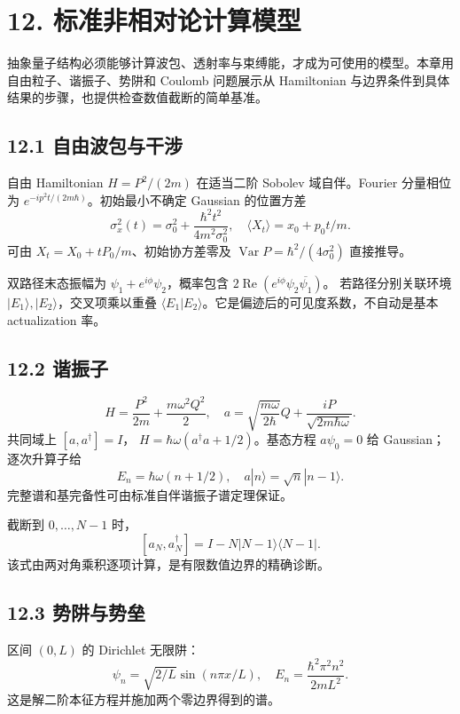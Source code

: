 \documentclass[
  11pt,
  oneside]{book}
\begin{document}
\chapter{12. 标准非相对论计算模型}\label{ch-12}\hypertarget{ch-12}{}

抽象量子结构必须能够计算波包、透射率与束缚能，才成为可使用的模型。本章用自由粒子、谐振子、势阱和
Coulomb 问题展示从 Hamiltonian
与边界条件到具体结果的步骤，也提供检查数值截断的简单基准。

\section{12.1 自由波包与干涉}

自由 Hamiltonian \(H=P^2/(2m)\) 在适当二阶 Sobolev 域自伴。Fourier
分量相位为 \(e^{-ip^2t/(2m\hbar)}\)。初始最小不确定 Gaussian 的位置方差
\[
\sigma_x^2(t)=\sigma_0^2+\frac{\hbar^2t^2}{4m^2\sigma_0^2},
\quad \langle X_t\rangle=x_0+p_0t/m.
\] 可由 \(X_t=X_0+tP_0/m\)、初始协方差零及
\(\operatorname{Var}P=\hbar^2/(4\sigma_0^2)\) 直接推导。

双路径末态振幅为 \(\psi_1+e^{i\phi}\psi_2\)，概率包含
\(2\operatorname{Re}(e^{i\phi}\psi_2\overline{\psi_1})\)。
若路径分别关联环境 \(|E_1\rangle,|E_2\rangle\)，交叉项乘以重叠
\(\langle E_1|E_2\rangle\)。它是偏迹后的可见度系数，不自动是基本
actualization 率。

\section{12.2 谐振子}

\[
H=\frac{P^2}{2m}+\frac{m\omega^2Q^2}{2},\quad
a=\sqrt{\frac{m\omega}{2\hbar}}Q+\frac{iP}{\sqrt{2m\hbar\omega}}.
\] 共同域上 \([a,a^\dagger]=I\)，
\(H=\hbar\omega(a^\dagger a+1/2)\)。基态方程 \(a\psi_0=0\) 给
Gaussian；逐次升算子给 \[
E_n=\hbar\omega(n+1/2),\quad
a|n\rangle=\sqrt n|n-1\rangle.
\] 完整谱和基完备性可由标准自伴谐振子谱定理保证。

截断到 \(0,\ldots,N-1\) 时， \[
[a_N,a_N^\dagger]=I-N|N-1\rangle\langle N-1|.
\] 该式由两对角乘积逐项计算，是有限数值边界的精确诊断。

\section{12.3 势阱与势垒}

区间 \((0,L)\) 的 Dirichlet 无限阱： \[
\psi_n=\sqrt{2/L}\sin(n\pi x/L),\quad
E_n=\frac{\hbar^2\pi^2n^2}{2mL^2}.
\] 这是解二阶本征方程并施加两个零边界得到的谱。
\end{document}
